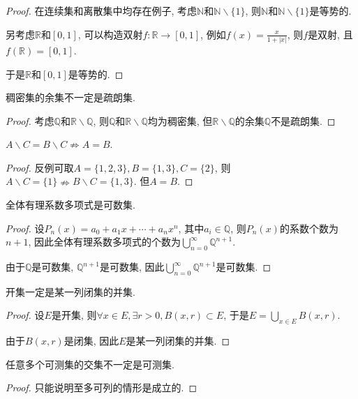 \documentclass[theorem=false,mathfont=none,openany,sub3section]{easybook}
\begin{document}
\begin{proof}
  在连续集和离散集中均存在例子, 考虑$\mathbb{N}$和$\mathbb{N}\backslash \{1\}$, 则$\mathbb{N}$和$\mathbb{N}\backslash \{1\}$是等势的.\par
  另考虑$\mathbb{R}$和$[0,1]$, 可以构造双射$f:\mathbb{R}\rightarrow [0,1]$, 例如$f(x)=\frac{x}{1+|x|}$, 则$f$是双射, 且$f(\mathbb{R})=[0,1]$.\par
  于是$\mathbb{R}$和$[0,1]$是等势的.\par
\end{proof}

\begin{example}
  稠密集的余集不一定是疏朗集.
\end{example}

\begin{proof}
  考虑$\mathbb{Q}$和$\mathbb{R}\backslash \mathbb{Q}$, 则$\mathbb{Q}$和$\mathbb{R}\backslash \mathbb{Q}$均为稠密集, 但$\mathbb{R}\backslash \mathbb{Q}$的余集$\mathbb{Q}$不是疏朗集.\par
\end{proof}

\begin{example}
  $A \backslash C =  B \backslash C \nRightarrow A = B$.
\end{example}

\begin{proof}
  反例可取$A=\{1,2,3\}, B=\{1,3\}, C=\{2\}$, 则$A \backslash C = \{1\} \nRightarrow B \backslash C = \{1,3\}$. 但$A=B$.\par
\end{proof}

\begin{example}
  全体有理系数多项式是可数集.
\end{example}

\begin{proof}
  设$P_n(x)=a_0+a_1x+\cdots+a_nx^n$, 其中$a_i\in \mathbb{Q}$, 则$P_n(x)$的系数个数为$n+1$, 因此全体有理系数多项式的个数为$\bigcup_{n=0}^{\infty}\mathbb{Q}^{n+1}$.\par
  由于$\mathbb{Q}$是可数集, $\mathbb{Q}^{n+1}$是可数集, 因此$\bigcup_{n=0}^{\infty}\mathbb{Q}^{n+1}$是可数集.\par
\end{proof}

\begin{example}
  开集一定是某一列闭集的并集.
\end{example}

\begin{proof}
  设$E$是开集, 则$\forall x\in E, \exists r>0, B(x,r)\subset E$, 于是$E=\bigcup_{x\in E}B(x,r)$.\par
  由于$B(x,r)$是闭集, 因此$E$是某一列闭集的并集.\par
\end{proof}

\begin{example}
  任意多个可测集的交集不一定是可测集.
\end{example}

\begin{proof}
  只能说明至多可列的情形是成立的.\par
\end{proof}

\backmatter
\end{document}
